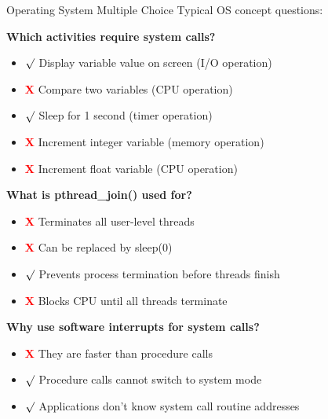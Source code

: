 \begin{example2}{Operating System Multiple Choice}
    Typical OS concept questions:
    
    \textbf{Which activities require system calls?}
    \begin{itemize}
        \item \textcolor{frog}{$\surd$} Display variable value on screen (I/O operation)
        \item \textcolor{red}{\textbf{X}} Compare two variables (CPU operation)
        \item \textcolor{frog}{$\surd$} Sleep for 1 second (timer operation)
        \item \textcolor{red}{\textbf{X}} Increment integer variable (memory operation)
        \item \textcolor{red}{\textbf{X}} Increment float variable (CPU operation)
    \end{itemize}
    
    \textbf{What is pthread\_join() used for?}
    \begin{itemize}
        \item \textcolor{red}{\textbf{X}} Terminates all user-level threads
        \item \textcolor{red}{\textbf{X}} Can be replaced by sleep(0)
        \item \textcolor{frog}{$\surd$} Prevents process termination before threads finish
        \item \textcolor{red}{\textbf{X}} Blocks CPU until all threads terminate
    \end{itemize}
    
    \textbf{Why use software interrupts for system calls?}
    \begin{itemize}
        \item \textcolor{red}{\textbf{X}} They are faster than procedure calls
        \item \textcolor{frog}{$\surd$} Procedure calls cannot switch to system mode
        \item \textcolor{frog}{$\surd$} Applications don't know system call routine addresses
    \end{itemize}
\end{example2}

